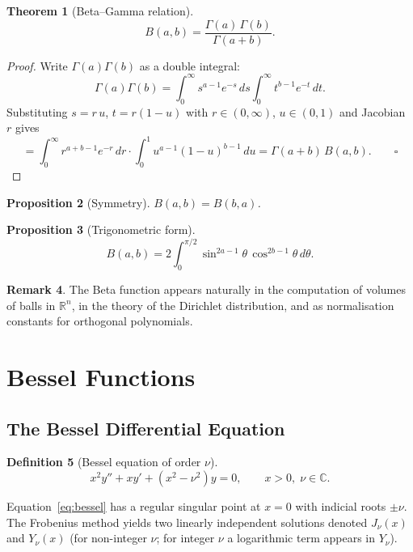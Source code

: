 \documentclass[12pt,a4paper]{amsart}
\newtheorem{theorem}{Theorem}[section]
\newtheorem{proposition}[theorem]{Proposition}
\theoremstyle{definition}
\newtheorem{definition}[theorem]{Definition}
\newtheorem{remark}[theorem]{Remark}
\begin{document}
\begin{theorem}[Beta--Gamma relation]\label{thm:beta_gamma}
\[
  B(a,b) = \frac{\Gamma(a)\,\Gamma(b)}{\Gamma(a+b)}.
\]
\end{theorem}

\begin{proof}
Write \(\Gamma(a)\Gamma(b)\) as a double integral:
\[
  \Gamma(a)\Gamma(b)
  = \int_0^\infty s^{a-1}e^{-s}\,ds\int_0^\infty t^{b-1}e^{-t}\,dt.
\]
Substituting \(s = r\,u\), \(t = r(1-u)\) with \(r \in (0,\infty)\), \(u \in (0,1)\)
and Jacobian \(r\) gives
\[
  = \int_0^\infty r^{a+b-1}e^{-r}\,dr \cdot \int_0^1 u^{a-1}(1-u)^{b-1}\,du
  = \Gamma(a+b)\,B(a,b). \qquad\square
\]
\end{proof}

\begin{proposition}[Symmetry]
\(B(a,b) = B(b,a)\).
\end{proposition}

\begin{proposition}[Trigonometric form]
\[
  B(a,b) = 2\int_0^{\pi/2}\sin^{2a-1}\theta\,\cos^{2b-1}\theta\,d\theta.
\]
\end{proposition}

\begin{remark}
The Beta function appears naturally in the computation of volumes of balls in
\(\mathbb{R}^n\), in the theory of the Dirichlet distribution, and as normalisation
constants for orthogonal polynomials.
\end{remark}

\section{Bessel Functions}
\label{sec:bessel}

\subsection{The Bessel Differential Equation}

\begin{definition}[Bessel equation of order \(\nu\)]
\begin{equation}\label{eq:bessel}
  x^2 y'' + x y' + (x^2 - \nu^2)y = 0, \qquad x > 0,\; \nu \in \mathbb{C}.
\end{equation}
\end{definition}

Equation~\eqref{eq:bessel} has a regular singular point at \(x = 0\) with indicial roots
\(\pm\nu\).  The Frobenius method yields two linearly independent solutions denoted
\(J_\nu(x)\) and \(Y_\nu(x)\) (for non-integer \(\nu\); for integer \(\nu\) a logarithmic
term appears in \(Y_\nu\)).
\end{document}
